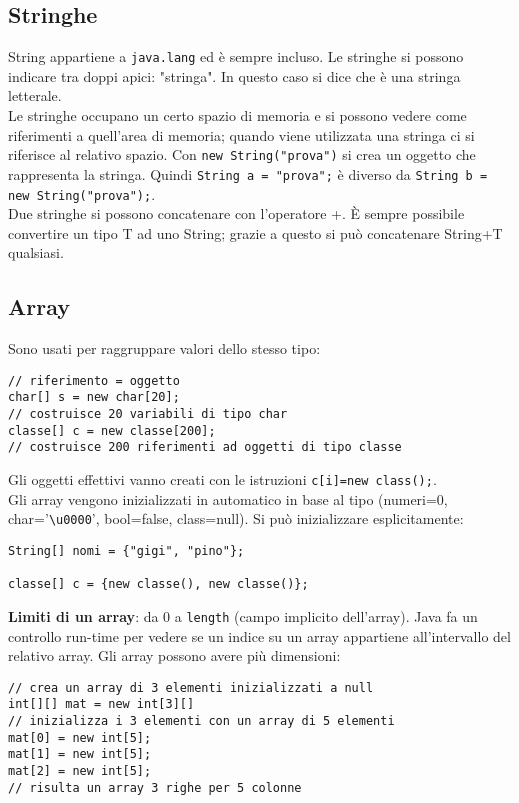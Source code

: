 \subsection{Stringhe}
String appartiene a \texttt{java.lang} ed è sempre incluso. 
Le stringhe si possono indicare tra doppi apici: "stringa". In questo caso si dice che è una stringa letterale. \\
Le stringhe occupano un certo spazio di memoria e si possono vedere come riferimenti a quell'area di memoria; quando viene utilizzata una stringa ci si riferisce al relativo spazio.
Con \texttt{new String("prova")} si crea un oggetto che rappresenta la stringa.
Quindi \texttt{String a = "prova";} è diverso da \texttt{String b = new String("prova");}. \\
Due stringhe si possono concatenare con l'operatore +. È sempre possibile convertire un tipo T ad uno String; grazie a questo si può concatenare String+T qualsiasi.

\subsection{Array}
Sono usati per raggruppare valori dello stesso tipo:
\begin{lstlisting}
// riferimento = oggetto
char[] s = new char[20];
// costruisce 20 variabili di tipo char
classe[] c = new classe[200];
// costruisce 200 riferimenti ad oggetti di tipo classe
\end{lstlisting}
Gli oggetti effettivi vanno creati con le istruzioni \texttt{c[i]=new class();}. \\
Gli array vengono inizializzati in automatico in base al tipo (numeri=0, char='\texttt{\textbackslash{}u0000}', bool=false, class=null).
Si può inizializzare esplicitamente:
\begin{lstlisting}
String[] nomi = {"gigi", "pino"};

classe[] c = {new classe(), new classe()};
\end{lstlisting}
\textbf{Limiti di un array}: da 0 a \texttt{length} (campo implicito dell'array). Java fa un controllo run-time per vedere se un indice su un array appartiene all'intervallo del relativo array.
Gli array possono avere più dimensioni:

\begin{lstlisting}
// crea un array di 3 elementi inizializzati a null
int[][] mat = new int[3][] 
// inizializza i 3 elementi con un array di 5 elementi
mat[0] = new int[5]; 
mat[1] = new int[5];
mat[2] = new int[5];
// risulta un array 3 righe per 5 colonne
\end{lstlisting}

